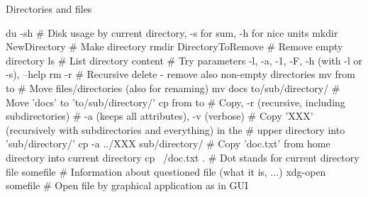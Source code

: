 \documentclass[compress, xelatex, 11pt, xcolor=svgnames, aspectratio=169, url={hyphens, lowtilde}]{beamer}
\begin{document}
\begin{frame}[fragile]{Directories and files}
	\begin{bashcode}
    du -sh # Disk usage by current directory, -s for sum, -h for nice units
    mkdir NewDirectory # Make directory
    rmdir DirectoryToRemove # Remove empty directory
    ls # List directory content
       # Try parameters -l, -a, -1, -F, -h (with -l or -s), --help
    rm -r # Recursive delete - remove also non-empty directories
    mv from to # Move files/directories (also for renaming)
    mv docs to/sub/directory/ # Move 'docs' to 'to/sub/directory/'
    cp from to # Copy, -r (recursive, including subdirectories)
               # -a (keeps all attributes), -v (verbose)
    # Copy 'XXX' (recursively with subdirectories and everything) in the
    # upper directory into 'sub/directory/'
    cp -a ../XXX sub/directory/
    # Copy 'doc.txt' from home directory into current directory
    cp ~/doc.txt . # Dot stands for current directory
    file somefile # Information about questioned file (what it is, ...)
    xdg-open somefile # Open file by graphical application as in GUI
	\end{bashcode}
\end{frame}
\end{document}
